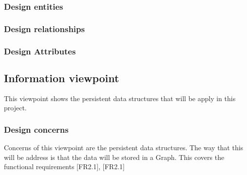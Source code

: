 \documentclass[12pt]{article}
\begin{document}
            
            \subsubsection{Design entities}
            
            \subsubsection{Design relationships}
            
            \subsubsection{Design Attributes}
        
        \subsection{Information viewpoint}%
            This viewpoint shows the persistent data structures that will be apply in this project.
            \subsubsection{Design concerns}
                Concerns of this viewpoint are the persistent data structures. The way that this will be address is that the data will be stored in a Graph. This covers the functional requirements [FR2.1], [FR2.1]
            
\end{document}
